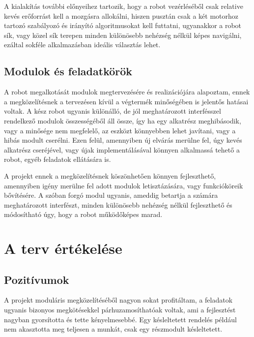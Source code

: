 A kialakítás további előnyeihez tartozik, hogy a robot vezérléséből csak relative
kevés erőforrást kell a mozgásra allokálni, hiszen pusztán csak a két motorhoz
tartozó szabályozó és irányító algoritmusokat kell futtatni, ugyanakkor a robot
sík, vagy közel sík terepen minden különösebb nehézség nélkül képes navigálni,
ezáltal sokféle alkalmazásban ideális választás lehet.

\subsection{Modulok és feladatkörök}

A robot megalkotását modulok megtervezésére és realizációjára alapoztam, ennek a
megközelítésnek a tervezésen kívül a végtermék minőségében is jelentős hatásai
voltak. A kész robot ugyanis különálló, de jól meghatározott interfésszel
rendelkező modulok összességéből áll össze, így ha egy alkatrész meghibásodik,
vagy a minősége nem megfelelő, az eszközt könnyebben lehet javítani, vagy a hibás
modult cserélni. Ezen felül, amennyiben új elvárás merülne fel, úgy kevés
alkatrész cseréjével, vagy újak implementálásával könnyen alkalmassá tehető a
robot, egyéb feladatok ellátására is.

A projekt ennek a megközelítésnek köszönhetően könnyen fejleszthető, amennyiben
igény merülne fel adott modulok letisztázására, vagy funkcióköreik bővítésére. A
szóban forgó modul ugyanis, ameddig betartja a számára meghatározott interfészt,
minden különösebb nehézség nélkül fejleszthető és módosítható úgy, hogy a robot
működőképes marad.







\section{A terv értékelése}

\subsection{Pozitívumok}

A projekt moduláris megközelítéséből nagyon sokat profitáltam, a feladatok
ugyanis bizonyos megkötésekkel párhuzamosíthatóak voltak, ami a fejlesztést
nagyban gyorsította és tette kényelmesebbé. Egy késleltetett rendelés például nem
akasztotta meg teljesen a munkát, csak egy részmodult késleltetett.

